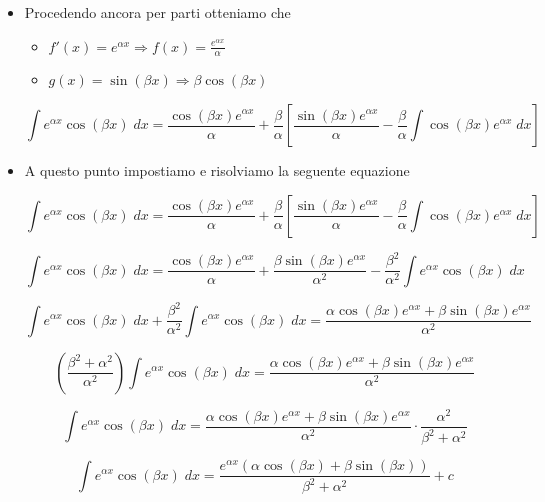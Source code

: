 \documentclass[a4paper, 12pt]{report}
\begin{document}
\begin{enumerate}
\begin{itemize}
            \item Procedendo ancora per parti otteniamo che
            
            \begin{itemize}
                \item $f'(x) = e^{\alpha x} \Longrightarrow f(x) = \frac{e^{\alpha x}}{\alpha}$
                \item $g(x) = \sin(\beta x) \Longrightarrow \beta \cos(\beta x)$
            \end{itemize}
            
            \[ \int e^{\alpha x} \cos(\beta x) \; dx = \frac{\cos(\beta x)e^{\alpha x}}{\alpha} + \frac{\beta}{\alpha} \left [ \frac{\sin(\beta x)e^{\alpha x}}{\alpha} - \frac{\beta}{\alpha} \int \cos(\beta x)e^{\alpha x} \; dx \right ] \]
            
            \item A questo punto impostiamo e risolviamo la seguente equazione
            
            \[ \int e^{\alpha x} \cos(\beta x) \; dx = \frac{\cos(\beta x)e^{\alpha x}}{\alpha} + \frac{\beta}{\alpha} \left [ \frac{\sin(\beta x)e^{\alpha x}}{\alpha} - \frac{\beta}{\alpha} \int \cos(\beta x)e^{\alpha x} \; dx \right ] \]
            
            \[ \int e^{\alpha x} \cos(\beta x) \; dx = \frac{\cos(\beta x)e^{\alpha x}}{\alpha} + \frac{\beta \sin(\beta x)e^{\alpha x}}{\alpha^2} - \frac{\beta^2}{\alpha^2} \int  e^{\alpha x} \cos(\beta x) \; dx \]
            
            \[ \int e^{\alpha x} \cos(\beta x) \; dx +  \frac{\beta^2}{\alpha^2} \int  e^{\alpha x} \cos(\beta x) \; dx = \frac{\alpha \cos(\beta x)e^{\alpha x} + \beta \sin(\beta x)e^{\alpha x}}{\alpha^2}\]
            
            \[ \left ( \frac{\beta^2 + \alpha^2}{\alpha^2} \right ) \int e^{\alpha x} \cos(\beta x) \; dx = \frac{\alpha \cos(\beta x)e^{\alpha x} + \beta \sin(\beta x)e^{\alpha x}}{\alpha^2}\]
            
            \[ \int e^{\alpha x} \cos(\beta x) \; dx = \frac{\alpha \cos(\beta x)e^{\alpha x} + \beta \sin(\beta x)e^{\alpha x}}{\alpha^2} \cdot \frac{\alpha^2}{\beta^2 + \alpha^2}\]
            
            \[ \int e^{\alpha x} \cos(\beta x) \; dx = \frac{e^{\alpha x} (\alpha \cos(\beta x) + \beta \sin(\beta x))}{\beta^2 + \alpha^2}+c\]
        \end{itemize}
        

\end{enumerate}
\end{document}
